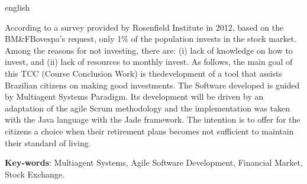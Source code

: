 \begin{resumo}[Abstract]
 \begin{otherlanguage*}{english}
   
   According to a survey provided by Rosenfield Institute in 2012, based on the BM\&FBovespa's request, only 1\% of the population invests in the stock market. Among the reasons for not investing, there are: (i) lack of knowledge on how to invest, and (ii) lack of resources to monthly invest. As follows, the main goal of this TCC (Course Conclusion Work) is thedevelopment of a tool that assists Brazilian citizens on making good investments. The Software  developed is guided by Multiagent Systems Paradigm. Its development will be driven by an adaptation of the agile Scrum methodology and the implementation was taken with the Java language with the Jade framework. The intention is to offer for the citizens a choice when their retirement plans becomes not sufficient to maintain their standard of living.


   \vspace{\onelineskip}
 
   \noindent 
   \textbf{Key-words}: Multiagent Systems, Agile Software Development, Financial Market, Stock Exchange.
 \end{otherlanguage*}
\end{resumo}
